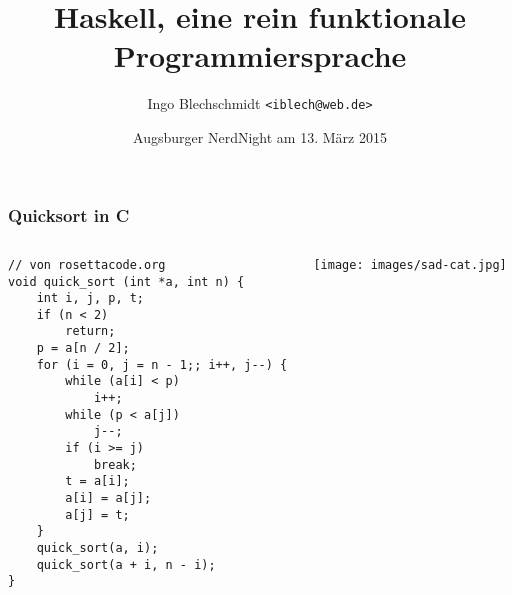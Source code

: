 \documentclass[12pt,compress,ngerman,utf8,t]{beamer}
\title{Haskell, eine rein funktionale Programmiersprache}
\author{Ingo Blechschmidt \texttt{<iblech@web.de>}}
\date{Augsburger NerdNight am 13. März 2015}
\begin{document}


\begin{frame}[fragile]\frametitle{Quicksort in C}
  \begin{columns}
    \begin{column}[b]{0.6\textwidth}
      \scriptsize
      \begin{verbatim}
// von rosettacode.org
void quick_sort (int *a, int n) {
    int i, j, p, t;
    if (n < 2)
        return;
    p = a[n / 2];
    for (i = 0, j = n - 1;; i++, j--) {
        while (a[i] < p)
            i++;
        while (p < a[j])
            j--;
        if (i >= j)
            break;
        t = a[i];
        a[i] = a[j];
        a[j] = t;
    }
    quick_sort(a, i);
    quick_sort(a + i, n - i);
}
      \end{verbatim}
    \end{column}

    \begin{column}{0.2\textwidth}
      \texttt{[image: images/sad-cat.jpg]}
    \end{column}
  \end{columns}
\end{frame}
\end{document}
